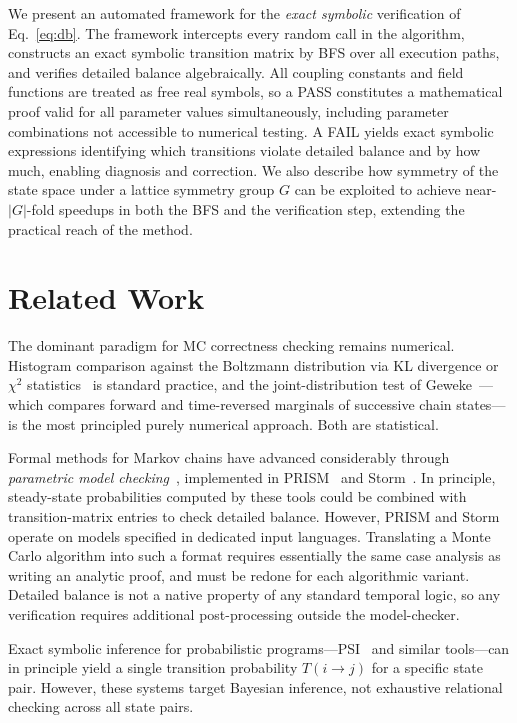 \documentclass[twocolumn,10pt]{article}
\begin{document}
We present an automated framework for the \emph{exact symbolic} verification
of Eq.~\eqref{eq:db}.  The framework intercepts every random call in the
algorithm, constructs an exact symbolic transition matrix by BFS over all
execution paths, and verifies detailed balance algebraically.  All coupling
constants and field functions are treated as free real symbols, so a PASS
constitutes a mathematical proof valid for all parameter values
simultaneously, including parameter combinations not accessible to numerical
testing.  A FAIL yields exact symbolic expressions identifying which
transitions violate detailed balance and by how much, enabling diagnosis and
correction.  We also describe how symmetry of the state space under a lattice
symmetry group $G$ can be exploited to achieve near-$|G|$-fold speedups in
both the BFS and the verification step, extending the practical reach of the
method.

\section{Related Work}
\label{sec:related}

The dominant paradigm for MC correctness checking remains numerical.
Histogram comparison against the Boltzmann distribution via KL divergence or
$\chi^2$ statistics~\cite{Newman1999} is standard practice, and the
joint-distribution test of Geweke~\cite{Geweke2004}---which compares forward
and time-reversed marginals of successive chain states---is the most
principled purely numerical approach.  Both are statistical.

Formal methods for Markov chains have advanced considerably through
\emph{parametric model checking}~\cite{Daws2004}, implemented in PRISM~\cite{Kwiatkowska2011}
and Storm~\cite{Dehnert2017}.  In principle, steady-state probabilities
computed by these tools could be combined with transition-matrix entries to
check detailed balance.  However, PRISM and Storm operate on models specified
in dedicated input languages.  Translating a Monte Carlo algorithm into such
a format requires essentially the same case analysis as writing an analytic
proof, and must be redone for each algorithmic variant.  Detailed balance is
not a native property of any standard temporal logic, so any verification
requires additional post-processing outside the model-checker.

Exact symbolic inference for probabilistic programs---PSI~\cite{Gehr2016}
and similar tools---can in principle yield a single transition probability
$T(i\to j)$ for a specific state pair.  However, these systems target
Bayesian inference, not exhaustive relational checking across all state
pairs.
\end{document}
